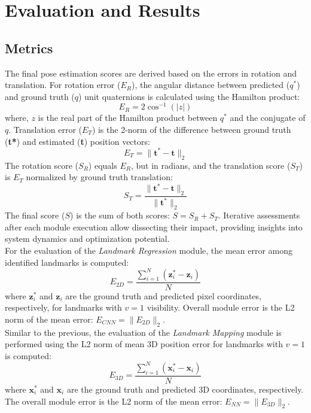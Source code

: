 \section{Evaluation and Results}
\subsection{Metrics}
The final pose estimation scores are derived based on the errors in rotation and translation. For rotation error ($E_R$), the angular distance between predicted ($q^*$) and ground truth ($q$) unit quaternions is calculated using the Hamilton product:
\[ E_R = 2\cos^{-1}(|z|) \]
where, $z$ is the real part of the Hamilton product between $q^*$ and the conjugate of $q$. Translation error ($E_T$) is the 2-norm of the difference between ground truth (\textbf{t*}) and estimated (\textbf{t}) position vectors:
\[ E_T = \|\textbf{t}^*-\textbf{t}\|_2 \]
The rotation score ($S_R$) equals $E_R$, but in radians, and the translation score ($S_T$) is $E_T$ normalized by ground truth translation:
\[ S_T = \frac{\|\textbf{t}^*-\textbf{t}\|_2}{\|\textbf{t}^*\|_2} \]
The final score ($S$) is the sum of both scores: $S = S_R + S_T$. Iterative assessments after each module execution allow dissecting their impact, providing insights into system dynamics and optimization potential.\\
For the evaluation of the \textit{Landmark Regression} module, the mean error among identified landmarks is computed:
\[ E_{2D} = \frac{\sum_{i=1}^{N} (\textbf{z}^{*}_{i}-\textbf{z}_i)}{N} \]
where $\textbf{z}_{i}^{*}$ and $\textbf{z}_{i}$ are the ground truth and predicted pixel coordinates, respectively, for landmarks with $v=1$ visibility. Overall module error is the L2 norm of the mean error: $E_{CNN} = \|E_{2D}\|_2$.\\
Similar to the previous, the evaluation of the \textit{Landmark Mapping} module is performed using the L2 norm of mean 3D position error for landmarks with $v = 1$ is computed:
\[ E_{3D} = \frac{\sum_{i=1}^{N} (\textbf{x}^{*}_{i}-\textbf{x}_i)}{N} \]
where $\textbf{x}^{*}_{i}$ and $\textbf{x}_i$ are the ground truth and predicted 3D coordinates, respectively. The overall module error is the L2 norm of the mean error: $E_{NN} = \|E_{3D}\|_2$.

